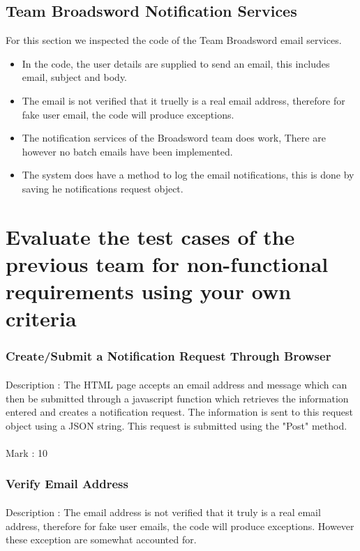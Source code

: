 \documentclass[11pt]{article}
\begin{document}
	\subsection{Team Broadsword Notification Services}
	For this section we inspected the code of the Team Broadsword email services.
	\begin{itemize}
		\item In the code, the user details are supplied to send an email, this includes email, subject and body. 
		\item The email is not verified that it truelly is a real email address, therefore for fake user email, the code will produce exceptions. 
		\item The notification services of the Broadsword team does work, There are however no batch emails have been implemented.
		\item The system does have a method to log the email notifications, this is done by saving he notifications request object.  
	\end{itemize}
	\section{Evaluate the test cases of the previous team for non-functional requirements using your own criteria}	

\subsubsection{Create/Submit a Notification Request Through Browser} 
\paragraph{}Description : The HTML page accepts an email address and message which can then be submitted through a javascript function which retrieves the information entered and creates a notification request. The information is sent to this request object using a JSON string. This request is submitted using the "Post" method.
\paragraph{} Mark : 10

\subsubsection{Verify Email Address} 
\paragraph{}Description : The email address is not verified that it truly is a real email address, therefore for fake user emails, the code will produce exceptions. However these exception are somewhat accounted for.
\end{document}
